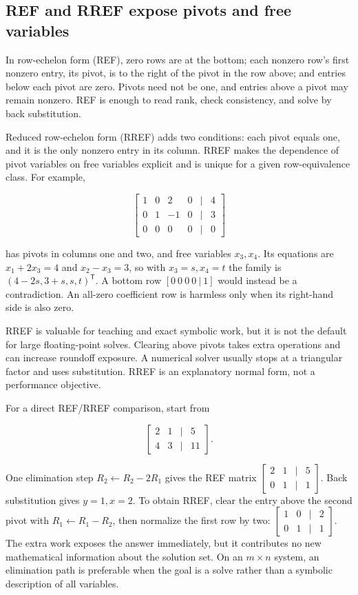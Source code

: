 \subsection{REF and RREF expose pivots and free variables}\label{01-foundations-i-ch019-ref-and-rref-expose-pivots-and-free-variables}

In row-echelon form (REF), zero rows are at the bottom; each nonzero row's first nonzero entry, its pivot, is to the right of the pivot in the row above; and entries below each pivot are zero. Pivots need not be one, and entries above a pivot may remain nonzero. REF is enough to read rank, check consistency, and solve by back substitution.

Reduced row-echelon form (RREF) adds two conditions: each pivot equals one, and it is the only nonzero entry in its column. RREF makes the dependence of pivot variables on free variables explicit and is unique for a given row-equivalence class. For example,

\[
\begin{bmatrix}1&0&2&0&|&4\\0&1&-1&0&|&3\\0&0&0&0&|&0\end{bmatrix}
\]

has pivots in columns one and two, and free variables \(x_3,x_4\). Its equations are \(x_1+2x_3=4\) and \(x_2-x_3=3\), so with \(x_3=s,x_4=t\) the family is \((4-2s,3+s,s,t)^\mathsf T\). A bottom row \([0\ 0\ 0\ 0\ |\ 1]\) would instead be a contradiction. An all-zero coefficient row is harmless only when its right-hand side is also zero.

RREF is valuable for teaching and exact symbolic work, but it is not the default for large floating-point solves. Clearing above pivots takes extra operations and can increase roundoff exposure. A numerical solver usually stops at a triangular factor and uses substitution. RREF is an explanatory normal form, not a performance objective.

For a direct REF/RREF comparison, start from

\[
\begin{bmatrix}2&1&|&5\\4&3&|&11\end{bmatrix}.
\]

One elimination step \(R_2\leftarrow R_2-2R_1\) gives the REF matrix \(\begin{bmatrix}2&1&|&5\\0&1&|&1\end{bmatrix}\). Back substitution gives \(y=1,x=2\). To obtain RREF, clear the entry above the second pivot with \(R_1\leftarrow R_1-R_2\), then normalize the first row by two: \(\begin{bmatrix}1&0&|&2\\0&1&|&1\end{bmatrix}\). The extra work exposes the answer immediately, but it contributes no new mathematical information about the solution set. On an \(m\times n\) system, an elimination path is preferable when the goal is a solve rather than a symbolic description of all variables.

